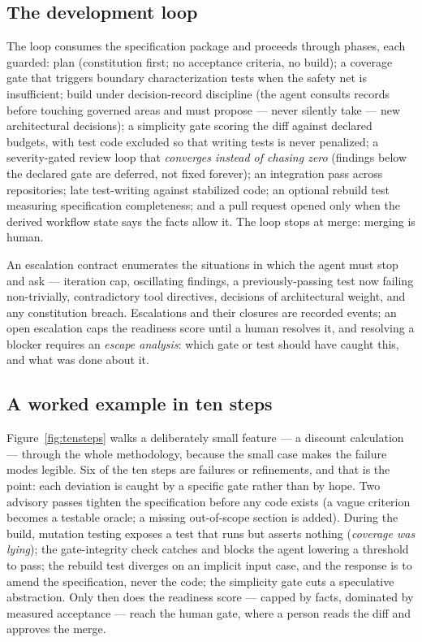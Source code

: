 \documentclass[11pt]{article}
\begin{document}
\subsection{The development loop}

The loop consumes the specification package and proceeds through phases, each
guarded: plan (constitution first; no acceptance criteria, no build); a
coverage gate that triggers boundary characterization tests when the safety
net is insufficient; build under decision-record discipline (the agent
consults records before touching governed areas and must propose --- never
silently take --- new architectural decisions); a simplicity gate scoring the
diff against declared budgets, with test code excluded so that writing tests
is never penalized; a severity-gated review loop that \emph{converges instead
of chasing zero} (findings below the declared gate are deferred, not fixed
forever); an integration pass across repositories; late test-writing against
stabilized code; an optional rebuild test measuring specification
completeness; and a pull request opened only when the derived workflow state
says the facts allow it. The loop stops at merge: merging is human.

An escalation contract enumerates the situations in which the agent must stop
and ask --- iteration cap, oscillating findings, a previously-passing test now
failing non-trivially, contradictory tool directives, decisions of
architectural weight, and any constitution breach. Escalations and their
closures are recorded events; an open escalation caps the readiness score
until a human resolves it, and resolving a blocker requires an \emph{escape
analysis}: which gate or test should have caught this, and what was done about
it.

\subsection{A worked example in ten steps}

Figure~\ref{fig:tensteps} walks a deliberately small feature --- a discount
calculation --- through the whole methodology, because the small case makes
the failure modes legible. Six of the ten steps are failures or refinements,
and that is the point: each deviation is caught by a specific gate rather than
by hope. Two advisory passes tighten the specification before any code exists
(a vague criterion becomes a testable oracle; a missing out-of-scope section
is added). During the build, mutation testing exposes a test that runs but
asserts nothing (\emph{coverage was lying}); the gate-integrity check catches
and blocks the agent lowering a threshold to pass; the rebuild test diverges
on an implicit input case, and the response is to amend the specification,
never the code; the simplicity gate cuts a speculative abstraction. Only then
does the readiness score --- capped by facts, dominated by measured acceptance
--- reach the human gate, where a person reads the diff and approves the
merge.
\end{document}
